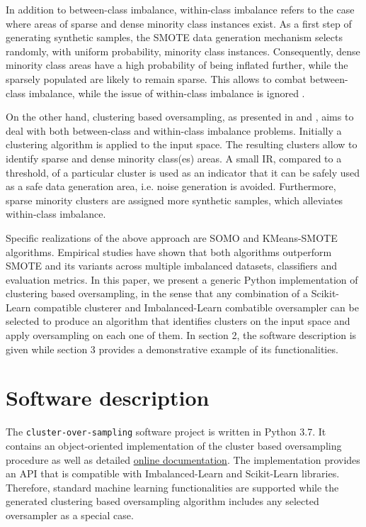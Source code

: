\documentclass[preprint,12pt, a4paper]{elsarticle}
\begin{document}
In addition to between-class imbalance, within-class imbalance refers to the case where areas of sparse and dense minority class instances exist. As a first step of generating synthetic samples, the SMOTE data generation mechanism selects randomly, with uniform probability, minority class instances. Consequently, dense minority class areas have a high probability of being inflated further, while the sparsely populated are likely to remain sparse. This allows to combat between-class imbalance, while the issue of within-class imbalance is ignored \cite{Prati2004}.

On the other hand, clustering based oversampling, as presented in \cite{Douzas2017a} and \cite{Douzas2018}, aims to deal with both between-class and within-class imbalance problems. Initially a clustering algorithm is applied to the input space. The resulting clusters allow to identify sparse and dense minority class(es) areas. A small IR, compared to a threshold, of a particular cluster is used as an indicator that it can be safely used as a safe data generation area, i.e. noise generation is avoided. Furthermore, sparse minority clusters are assigned more synthetic samples, which alleviates within-class imbalance.

Specific realizations of the above approach are SOMO \cite{Douzas2017a} and KMeans-SMOTE \cite{Douzas2018} algorithms. Empirical studies have shown that both algorithms outperform SMOTE and its variants across multiple imbalanced datasets, classifiers and evaluation metrics. In this paper, we present a generic Python implementation of clustering based oversampling, in the sense that any combination of a Scikit-Learn compatible clusterer and Imbalanced-Learn combatible oversampler can be selected to produce an algorithm that identifies clusters on the input space and apply oversampling on each one of them.  In section 2, the software description is given while section 3 provides a demonstrative example of its functionalities.

\section{Software description}

The \texttt{cluster-over-sampling} software project is written in Python 3.7. It contains an object-oriented implementation of the cluster based oversampling procedure as well as detailed \href{https://cluster-over-sampling.readthedocs.io/}{online documentation}. The implementation provides an API that is compatible with Imbalanced-Learn and Scikit-Learn libraries. Therefore, standard machine learning functionalities are supported while the generated clustering based oversampling algorithm includes any selected oversampler as a special case.
\end{document}
